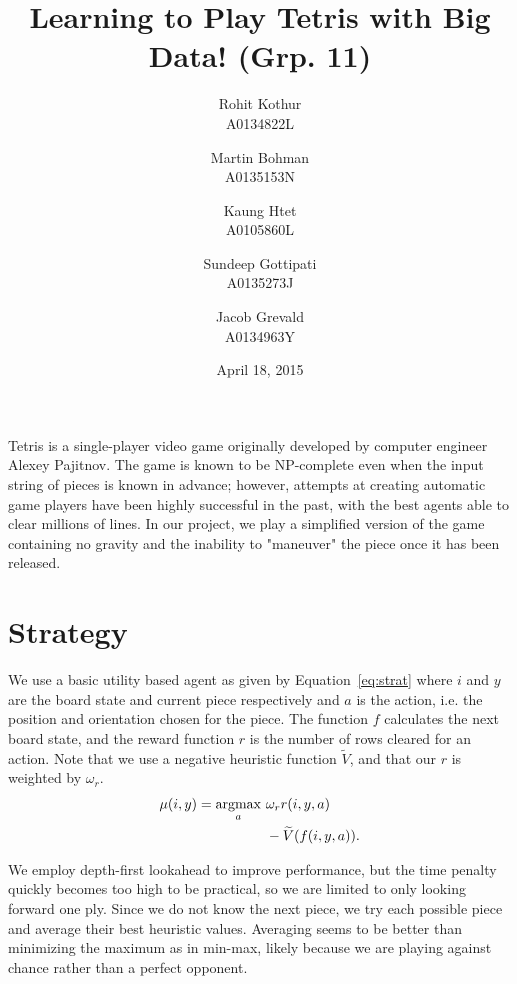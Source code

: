 \documentclass[12pt, twocolumn]{article}
\title{Learning to Play Tetris with Big Data! (Grp. 11)}
\author{
	Rohit Kothur \\ A0134822L \and
	Martin Bohman \\ A0135153N \and
	Kaung Htet \\ A0105860L \and
	Sundeep Gottipati \\ A0135273J \and
	Jacob Grevald \\ A0134963Y}
\date{April 18, 2015}
\begin{document}
\maketitle

Tetris is a single-player video game originally developed by computer engineer
Alexey Pajitnov. The game is known to be NP-complete even when the input string
of pieces is known in advance; however, attempts at creating automatic game
players have been highly successful in the past, with the best agents able to
clear millions of lines. In our project, we play a simplified version of the
game containing no gravity and the inability to "maneuver" the piece once it
has been released.

\section*{Strategy}
We use a basic utility based agent as given by Equation~\ref{eq:strat} where
$i$ and $y$ are the board state and current piece respectively and $a$ is the
action, i.e. the position and orientation chosen for the piece. The function $f$
calculates the next board state, and the reward function $r$ is the number of
rows cleared for an action. Note that we use a negative heuristic
function $\widetilde{V}$, and that our $r$ is weighted by $\omega_r$.
\begin{align}
	\mu(i,y) = \underset{a}{\operatorname{argmax}}
		~ &\omega_{r} r(i,y,a) \notag \\
		&- \widetilde{V}(f(i,y,a)).
	\label{eq:strat}
\end{align}

We employ depth-first lookahead to improve performance, but the time
penalty quickly becomes too high to be practical, so we are limited to only looking
forward one ply. Since we do not know the next piece, we try each
possible piece and average their best heuristic values. Averaging seems to be
better than minimizing the maximum as in min-max, likely because we are
playing against chance rather than a perfect opponent.
\end{document}
